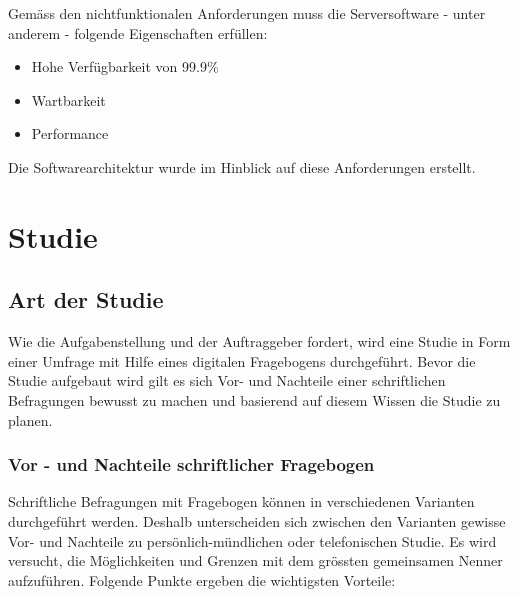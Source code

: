 Gemäss den nichtfunktionalen Anforderungen muss die Serversoftware -
unter anderem - folgende Eigenschaften erfüllen:

\begin{itemize}
\tightlist
\item
  Hohe Verfügbarkeit von 99.9\%
\item
  Wartbarkeit
\item
  Performance
\end{itemize}

Die Softwarearchitektur wurde im Hinblick auf diese Anforderungen
erstellt.

\newpage

\chapter{Studie}\label{studie}

\section{Art der Studie}\label{art-der-studie}

Wie die Aufgabenstellung und der Auftraggeber fordert, wird eine Studie
in Form einer Umfrage mit Hilfe eines digitalen Fragebogens
durchgeführt. Bevor die Studie aufgebaut wird gilt es sich Vor- und
Nachteile einer schriftlichen Befragungen bewusst zu machen und
basierend auf diesem Wissen die Studie zu planen.

\subsection{Vor - und Nachteile schriftlicher
Fragebogen}\label{vor---und-nachteile-schriftlicher-fragebogen}

Schriftliche Befragungen mit Fragebogen können in verschiedenen
Varianten durchgeführt werden. Deshalb unterscheiden sich zwischen den
Varianten gewisse Vor- und Nachteile zu persönlich-mündlichen oder
telefonischen Studie. Es wird versucht, die Möglichkeiten und Grenzen
mit dem grössten gemeinsamen Nenner aufzuführen. Folgende Punkte ergeben
die wichtigsten Vorteile:

